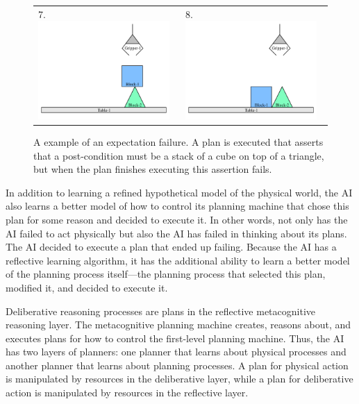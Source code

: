 \begin{figure}
\begin{center}
\begin{tabular}{p{4cm}p{4cm}}
7. \includegraphics[width=5cm]{gfx/blocks_world_example-7}  & 8. \includegraphics[width=5cm]{gfx/blocks_world_example-8}
\end{tabular}
\end{center}
\caption[A example of an expectation failure.]{A example of an
  expectation failure.  A plan is executed that asserts that a
  post-condition must be a stack of a cube on top of a triangle, but
  when the plan finishes executing this assertion fails.}
\label{figure:failure_to_stack_cube_on_pyramid}
\end{figure}

In addition to learning a refined hypothetical model of the physical
world, the AI also learns a better model of how to control its
planning machine that chose this plan for some reason and decided to
execute it.  In other words, not only has the AI failed to act
physically but also the AI has failed in thinking about its plans.
The AI decided to execute a plan that ended up failing.  Because the
AI has a reflective learning algorithm, it has the additional ability
to learn a better model of the planning process itself---the planning
process that selected this plan, modified it, and decided to execute
it.

Deliberative reasoning processes are plans in the reflective
metacognitive reasoning layer.  The metacognitive planning machine
creates, reasons about, and executes plans for how to control the
first-level planning machine.  Thus, the AI has two layers of
planners: one planner that learns about physical processes and another
planner that learns about planning processes.  A plan for physical
action is manipulated by resources in the deliberative layer, while a
plan for deliberative action is manipulated by resources in the
reflective layer.

